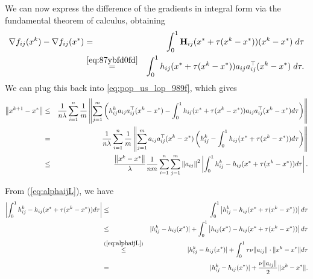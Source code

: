 \documentclass[10pt]{article}
\newcommand{\norm}[1]{\left\|#1\right\|}
\newcommand{\mH}{\mathbf{H}}
\begin{document}
We can now express the difference of the gradients in integral form via the fundamental theorem of calculus, obtaining 
\begin{eqnarray*} \nabla f_{ij}(x^k) - \nabla f_{ij}(x^*) &=&   \int_{0}^1 \mH_{ij} (x^* + \tau(x^k - x^*)) (x^k - x^*) \; d\tau \\
&\overset{\eqref{eq:87ybfd0fd}}{=} & \int_{0}^1 h_{ij}(x^* + \tau(x^k - x^*)) a_{ij}a_{ij}^\top  (x^k - x^*)\; d\tau .\end{eqnarray*}
We can plug this back into \eqref{eq:pop_us_lop_989f}, which gives
\begin{eqnarray}	
\norm{ x^{k+1} - x^* }	&\leq & 
 \frac{1}{n \lambda} \sum_{i=1}^n \frac{1}{m} \norm{  \sum_{j=1}^{m} \left(  h_{ij}^k a_{ij}a_{ij}^\top (x^k - x^*)  -  \int_{0}^1 h_{ij} (x^* + \tau(x^k - x^*))a_{ij}a_{ij}^\top (x^k - x^*)d\tau  \right)   } \notag \\ 
	&=& \frac{1}{n \lambda} \sum_{i=1}^n \frac{1}{m} \norm{  \sum_{j=1}^{m}  a_{ij}a_{ij}^\top (x^k - x^*) \left( h_{ij}^k - \int_{0}^1 h_{ij}(x^* + \tau(x^k - x^*))  d\tau \right) }\notag \\ 
	&\leq& \frac{ \norm{x^k - x^*}}{ \lambda} \frac{1}{nm} \sum_{i=1}^n \sum_{j=1}^{m} \norm{a_{ij}}^2 \left|   \int_{0}^1 h_{ij}^k - h_{ij}(x^* + \tau(x^k - x^*))  d\tau  \right|. \label{petrol-09809fd}
\end{eqnarray}

From (\ref{eq:alphaijL}), we have 
\begin{eqnarray}
	\left|   \int_{0}^1 h_{ij}^k - h_{ij}(x^* + \tau(x^k - x^*))  d\tau  \right| &\leq& \int_{0}^1 \left|  h_{ij}^k - h_{ij}(x^* + \tau(x^k - x^*))   \right| d\tau \notag \\
	&\leq& |h_{ij}^k - h_{ij}(x^*)| + \int_{0}^1 \left|  h_{ij}(x^*) -  h_{ij}(x^* + \tau(x^k - x^*))   \right| d \tau \notag \\ 
	&\overset{(\ref{eq:alphaijL})}{\leq}&  |h_{ij}^k - h_{ij}(x^*)| + \int_{0}^1 \tau \nu \|a_{ij}\| \cdot \|x^k - x^*\| d\tau  \notag \\ 
	&=&  |h_{ij}^k - h_{ij}(x^*)| + \frac{\nu \|a_{ij}\|}{2} \|x^k-x^*\|. \label{eq:olive-09u0hfdih}
\end{eqnarray}
\end{document}
